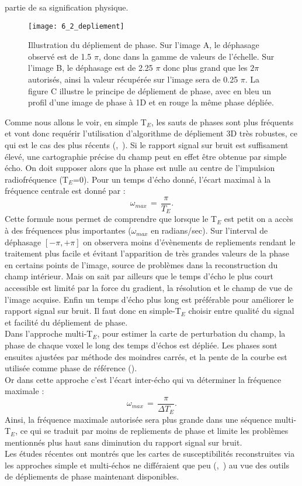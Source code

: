 {partie de sa signification physique.\\
\begin{figure}[!t]
\centering
\texttt{[image: 6\_2\_depliement]}
\caption{Illustration du dépliement de phase. Sur l’image A, le déphasage observé est de 1.5 $\pi$, donc dans la gamme de valeurs
de l’échelle. Sur l’image B, le déphasage est de 2.25 $\pi$ donc plus grand que les $2\pi$ autorisés, ainsi la valeur récupérée sur
l’image sera de 0.25 $\pi$. La figure C illustre le principe de dépliement de phase, avec en bleu un profil d’une image de phase à
1D et en rouge la même phase dépliée.
}
\label{fig:6_2_depliement}	
\end{figure}
Comme nous allons le voir, en simple T$_E$, les sauts de phases sont plus fréquents et vont donc
requérir l’utilisation d’algorithme de dépliement 3D très robustes, ce qui est le cas des plus récents
(\cite{Schofield2003},~\cite{Witoszynskyj2009}). Si le rapport signal sur bruit est suffisament élevé, une cartographie précise du champ peut
en effet être obtenue par simple écho. On doit supposer alors que la phase est nulle au centre de
l’impulsion radiofréquence (T$_E$=0). Pour un temps d’écho donné, l’écart maximal à la fréquence
centrale est donné par :
\begin{equation}
\omega_{max}\,=\,\frac{\pi}{T_E}.
\end{equation}
Cette formule nous permet de comprendre que lorsque le T$_E$ est petit on a accès à des
fréquences plus importantes ($\omega_{max}$ en radians/sec). Sur l’interval de déphasage $[-\pi,+\pi]$ on observera
moins d’évènements de repliements rendant le traitement plus facile et évitant l’apparition de très
grandes valeurs de la phase en certains points de l’image, source de problèmes dans la reconstruction
du champ intérieur. Mais on sait par ailleurs que le temps d’écho le plus court accessible est limité par
la force du gradient, la résolution et le champ de vue de l’image acquise. Enfin un temps d’écho plus
long est préférable pour améliorer le rapport signal sur bruit. Il faut donc en simple-T$_E$ choisir entre
qualité du signal et facilité du dépliement de phase.\\
Dans l’approche multi-T$_E$, pour estimer la carte de perturbation du champ, la phase de chaque
voxel le long des temps d’échos est dépliée. Les phases sont ensuites ajustées par méthode des
moindres carrés, et la pente de la courbe est utilisée comme phase de référence (\cite{Kressler2010}). \\
Or dans cette approche c’est l’écart inter-écho qui va déterminer la fréquence maximale :
\begin{equation}
\omega_{max}\,=\,\frac{\pi}{\Delta T_E}.
\end{equation}
Ainsi, la fréquence maximale autorisée sera plus grande dans une séquence multi-T$_E$, ce qui se traduit
par moins de repliements de phase et limite les problèmes mentionnés plus haut sans diminution du
rapport signal sur bruit.\\
Les études récentes ont montrés que les cartes de susceptibilités reconstruites via les
approches simple et multi-échos ne différaient que peu (\cite{Bilgic2012},~\cite{Schweser2012}) au vue des outils de dépliements
de phase maintenant disponibles.\\
}
